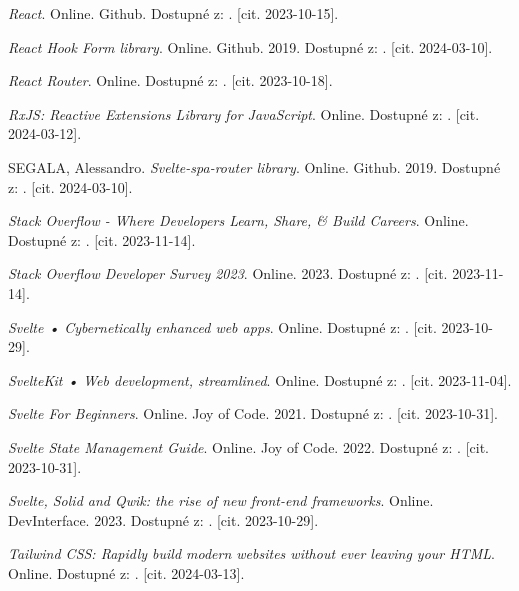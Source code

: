 \begin{thebibliography}{99}
\emph{React}. Online. Github. Dostupné z: . [cit. 2023-10-15].

\emph{React Hook Form library}. Online. Github. 2019. Dostupné z: . [cit. 2024-03-10].

\emph{React Router}. Online. Dostupné z: . [cit. 2023-10-18].

\emph{RxJS: Reactive Extensions Library for JavaScript}. Online. Dostupné z: . [cit. 2024-03-12].

\textsc{SEGALA}, Alessandro. \emph{Svelte-spa-router library}. Online. Github. 2019. Dostupné z: . [cit. 2024-03-10].

\emph{Stack Overflow - Where Developers Learn, Share, \& Build Careers}. Online. Dostupné z: . [cit. 2023-11-14].

\emph{Stack Overflow Developer Survey 2023}. Online. 2023. Dostupné z: . [cit. 2023-11-14].

\emph{Svelte • Cybernetically enhanced web apps}. Online. Dostupné z: . [cit. 2023-10-29].

\emph{SvelteKit • Web development, streamlined}. Online. Dostupné z: . [cit. 2023-11-04].

\emph{Svelte For Beginners}. Online. Joy of Code. 2021. Dostupné z: . [cit. 2023-10-31].

\emph{Svelte State Management Guide}. Online. Joy of Code. 2022. Dostupné z: . [cit. 2023-10-31].

\emph{Svelte, Solid and Qwik: the rise of new front-end frameworks}. Online. DevInterface. 2023. Dostupné z: . [cit. 2023-10-29].

\emph{Tailwind CSS: Rapidly build modern websites without ever leaving your HTML}. Online. Dostupné z: . [cit. 2024-03-13].


\end{thebibliography}
